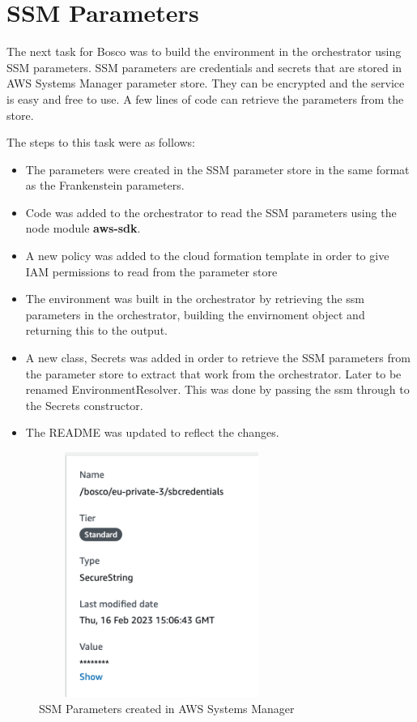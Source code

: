 \documentclass[12pt,a4paper,titlepage]{report}
\begin{document}
\section{SSM Parameters}
The next task for Bosco was to build the environment in the orchestrator using SSM parameters. 
SSM parameters are credentials and secrets that are stored in AWS Systems Manager parameter store. 
They can be encrypted and the service is easy and free to use. A few lines of code can retrieve the parameters from the store. 

The steps to this task were as follows:
\begin{itemize}
\item The parameters were created in the SSM parameter store in the same format as the Frankenstein parameters.
\item Code was added to the orchestrator to read the SSM parameters using the node module \textbf{aws-sdk}.
\item A new policy was added to the cloud formation template in order to give IAM permissions to read from the parameter store
\item The environment was built in the orchestrator by retrieving the ssm parameters in the orchestrator, building the envirnoment object and returning this to the output.
\item A new class, Secrets was added in order to retrieve the SSM parameters from the parameter store to extract that work from the orchestrator. Later to be renamed EnvironmentResolver. This was done by passing the ssm through to the Secrets constructor.
\item The README was updated to reflect the changes.
\end{itemize}

\begin{figure}[h]
  \centering
  \includegraphics[width=8cm,height=8cm,keepaspectratio]{./diagrams/ssm_params.png}
  \caption{SSM Parameters created in AWS Systems Manager}
\end{figure}
\end{document}

